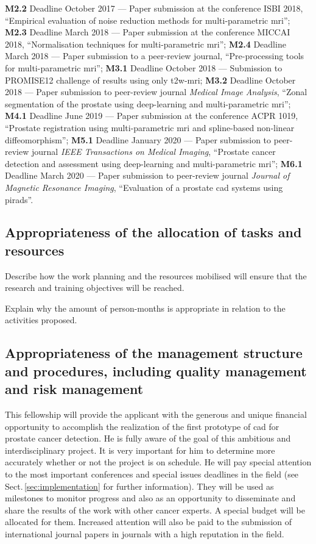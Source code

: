 \textbf{M2.2} Deadline October 2017 --- Paper submission at the conference ISBI 2018, ``Empirical evaluation of noise reduction methods for multi-parametric \ac{mri}'';
\textbf{M2.3} Deadline March 2018 --- Paper submission at the conference MICCAI 2018, ``Normalisation techniques for multi-parametric \ac{mri}'';
\textbf{M2.4} Deadline March 2018 --- Paper submission to a peer-review journal, ``Pre-processing tools for multi-parametric \ac{mri}'';
\textbf{M3.1} Deadline October 2018 --- Submission to PROMISE12 challenge of results using only \ac{t2w}-\ac{mri};
\textbf{M3.2} Deadline October 2018 --- Paper submission to peer-review journal \emph{Medical Image Analysis}, ``Zonal segmentation of the prostate using deep-learning and multi-parametric \ac{mri}'';
\textbf{M4.1} Deadline June 2019 --- Paper submission at the conference ACPR 1019, ``Prostate registration using multi-parametric \ac{mri} and spline-based non-linear diffeomorphism'';
\textbf{M5.1} Deadline January 2020 --- Paper submission to peer-review journal \emph{IEEE Transactions on Medical Imaging}, ``Prostate cancer detection and assessment using deep-learning and multi-parametric \ac{mri}'';
\textbf{M6.1} Deadline March 2020 --- Paper submission to peer-review journal \emph{Journal of Magnetic Resonance Imaging}, ``Evaluation of a prostate \ac{cad} systems using \ac{pirads}''.

\subsection{Appropriateness of the allocation of tasks and resources}

{\color{red} 
Describe how the work planning and the resources mobilised will ensure that the research and training objectives will be reached.

Explain why the amount of person-months is appropriate in relation to the activities proposed.}

\subsection{Appropriateness of the management structure and procedures, including quality management and risk management}

This fellowship will provide the applicant with the generous and unique financial opportunity to accomplish the realization of the first prototype of \ac{cad} for prostate cancer detection.
He is fully aware of the goal of this ambitious and interdisciplinary project.
It is very important for him to determine more accurately whether or not the project is on schedule. 
He will pay special attention to the most important conferences and special issues deadlines in the field (see Sect.\,\ref{sec:implementation} for further information). 
They will be used as milestones to monitor progress and also as an opportunity to disseminate and share the results of the work with other cancer experts.
A special budget will be allocated for them. 
Increased  attention will also be paid to the submission of international journal papers in journals with a high reputation in the field.

